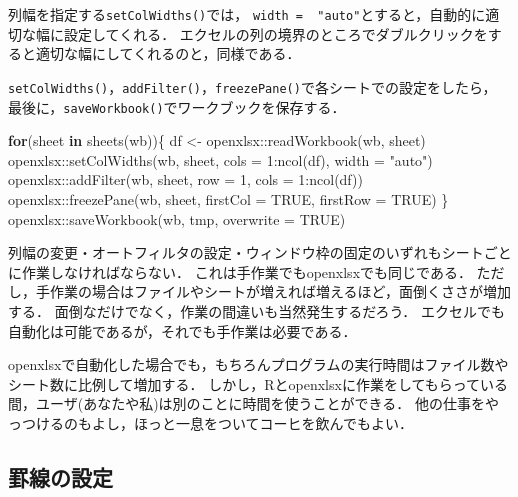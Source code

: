 \documentclass[
]{article}
\newenvironment{Shaded}{\begin{snugshade}}{\end{snugshade}}
\newcommand{\AttributeTok}[1]{\textcolor[rgb]{0.77,0.63,0.00}{#1}}
\newcommand{\ConstantTok}[1]{\textcolor[rgb]{0.00,0.00,0.00}{#1}}
\newcommand{\ControlFlowTok}[1]{\textcolor[rgb]{0.13,0.29,0.53}{\textbf{#1}}}
\newcommand{\DecValTok}[1]{\textcolor[rgb]{0.00,0.00,0.81}{#1}}
\newcommand{\FunctionTok}[1]{\textcolor[rgb]{0.00,0.00,0.00}{#1}}
\newcommand{\NormalTok}[1]{#1}
\newcommand{\OtherTok}[1]{\textcolor[rgb]{0.56,0.35,0.01}{#1}}
\newcommand{\SpecialCharTok}[1]{\textcolor[rgb]{0.00,0.00,0.00}{#1}}
\newcommand{\StringTok}[1]{\textcolor[rgb]{0.31,0.60,0.02}{#1}}
\begin{document}
列幅を指定する\texttt{setColWidths()}では， \texttt{width\ =\ \ "auto"}とすると，自動的に適切な幅に設定してくれる．
エクセルの列の境界のところでダブルクリックをすると適切な幅にしてくれるのと，同様である．

\texttt{setColWidths()}，\texttt{addFilter()}，\texttt{freezePane()}で各シートでの設定をしたら，
最後に，\texttt{saveWorkbook()}でワークブックを保存する．

\begin{Shaded}
\begin{Highlighting}[]
\ControlFlowTok{for}\NormalTok{(sheet }\ControlFlowTok{in} \FunctionTok{sheets}\NormalTok{(wb))\{}
\NormalTok{  df }\OtherTok{\textless{}{-}}\NormalTok{ openxlsx}\SpecialCharTok{::}\FunctionTok{readWorkbook}\NormalTok{(wb, sheet)}
\NormalTok{  openxlsx}\SpecialCharTok{::}\FunctionTok{setColWidths}\NormalTok{(wb, sheet, }\AttributeTok{cols =} \DecValTok{1}\SpecialCharTok{:}\FunctionTok{ncol}\NormalTok{(df), }\AttributeTok{width =}  \StringTok{"auto"}\NormalTok{)}
\NormalTok{  openxlsx}\SpecialCharTok{::}\FunctionTok{addFilter}\NormalTok{(wb, sheet, }\AttributeTok{row =} \DecValTok{1}\NormalTok{, }\AttributeTok{cols =} \DecValTok{1}\SpecialCharTok{:}\FunctionTok{ncol}\NormalTok{(df))}
\NormalTok{  openxlsx}\SpecialCharTok{::}\FunctionTok{freezePane}\NormalTok{(wb, sheet, }\AttributeTok{firstCol =} \ConstantTok{TRUE}\NormalTok{, }\AttributeTok{firstRow =} \ConstantTok{TRUE}\NormalTok{)}
\NormalTok{\}}
\NormalTok{openxlsx}\SpecialCharTok{::}\FunctionTok{saveWorkbook}\NormalTok{(wb, tmp, }\AttributeTok{overwrite =} \ConstantTok{TRUE}\NormalTok{)}
\end{Highlighting}
\end{Shaded}

列幅の変更・オートフィルタの設定・ウィンドウ枠の固定のいずれもシートごとに作業しなければならない．
これは手作業でもopenxlsxでも同じである．
ただし，手作業の場合はファイルやシートが増えれば増えるほど，面倒くささが増加する．
面倒なだけでなく，作業の間違いも当然発生するだろう．
エクセルでも自動化は可能であるが，それでも手作業は必要である．

openxlsxで自動化した場合でも，もちろんプログラムの実行時間はファイル数やシート数に比例して増加する．
しかし，Rとopenxlsxに作業をしてもらっている間，ユーザ(あなたや私)は別のことに時間を使うことができる．
他の仕事をやっつけるのもよし，ほっと一息をついてコーヒを飲んでもよい．

\hypertarget{ux7f6bux7ddaux306eux8a2dux5b9a}{%
\subsection{罫線の設定}\label{ux7f6bux7ddaux306eux8a2dux5b9a}}
\end{document}
